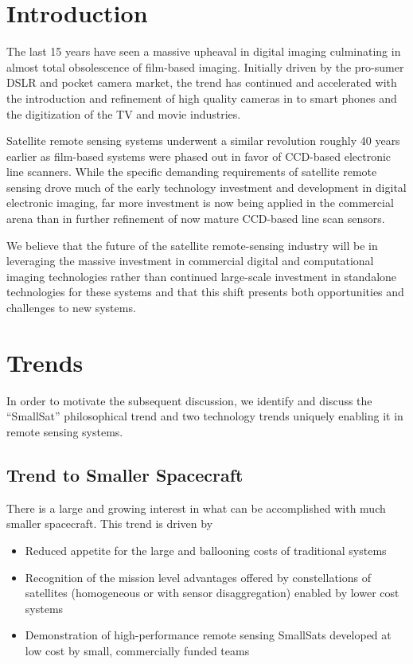 \documentclass[10pt,journal]{IEEEtran}  %
\begin{document}
\section{Introduction}
\label{sec:introduction}

The last 15 years have seen a massive upheaval in digital imaging culminating in almost total obsolescence of film-based imaging.  Initially driven by the pro-sumer DSLR and pocket camera market, the trend has continued and accelerated with the introduction and refinement of high quality cameras in to smart phones and the digitization of the TV and movie industries.

Satellite remote sensing systems underwent a similar revolution roughly 40 years earlier as film-based systems were phased out in favor of CCD-based electronic line scanners.  While the specific demanding requirements of satellite remote sensing drove much of the early technology investment and development in digital electronic imaging, far more investment is now being applied in the commercial arena than in further refinement of now mature CCD-based line scan sensors.

We believe that the future of the satellite remote-sensing industry will be in leveraging the massive investment in commercial digital and computational imaging technologies rather than continued large-scale investment in standalone technologies for these systems and that this shift presents both opportunities and challenges to new systems.

\section{Trends}
In order to motivate the subsequent discussion, we identify and discuss the ``SmallSat'' philosophical trend and two technology trends uniquely enabling it in remote sensing systems.

\subsection{Trend to Smaller Spacecraft}

\label{sec:smallsat}
There is a large and growing interest in what can be accomplished with much smaller spacecraft.  This trend is driven by 
\begin{itemize}
    \item Reduced appetite for the large and ballooning costs of traditional systems
    \item Recognition of the mission level advantages offered by constellations of satellites (homogeneous or with sensor disaggregation) enabled by lower cost systems
    \item Demonstration of high-performance remote sensing SmallSats developed at low cost by small, commercially funded teams
\end{itemize} 
\end{document}
